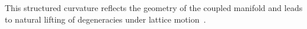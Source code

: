 \documentclass[12pt]{article}
\begin{document}
This structured curvature reflects the geometry of the coupled manifold and leads to natural lifting of degeneracies under lattice motion~\cite{Giustino2017,Yarkony1996}.









\end{document}
